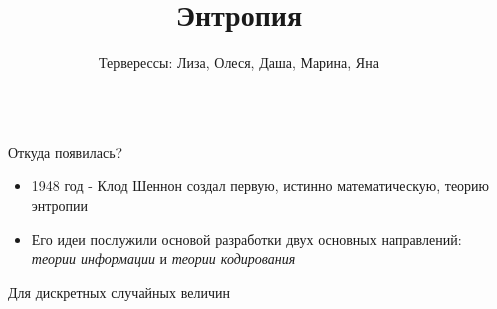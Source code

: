 \documentclass[final]{beamer}
\title{Энтропия} %
\author{Терверессы: Лиза, Олеся, Даша, Марина, Яна} %
\institute{БЭК 171} %
\newlength{\sepwid}
\newlength{\onecolwid}
\begin{document}

\setlength{\belowcaptionskip}{2ex} %
\setlength\belowdisplayshortskip{2ex} %

\begin{frame}[t] %

\begin{columns}[t] %

\begin{column}{\sepwid}\end{column} %

\begin{column}{\onecolwid} %



\begin{alertblock}{Откуда появилась?}
    \begin{itemize}
    \item 1948 год - Клод Шеннон создал первую, истинно математическую, теорию энтропии
    \item Его идеи послужили основой разработки двух основных направлений: \textit{теории информации} и \textit{теории кодирования}
    \end{itemize}
    
    \end{alertblock}

\begin{block}{Для дискретных случайных величин}


\end{block}
\end{column}
\end{columns}
\end{frame}
\end{document}
